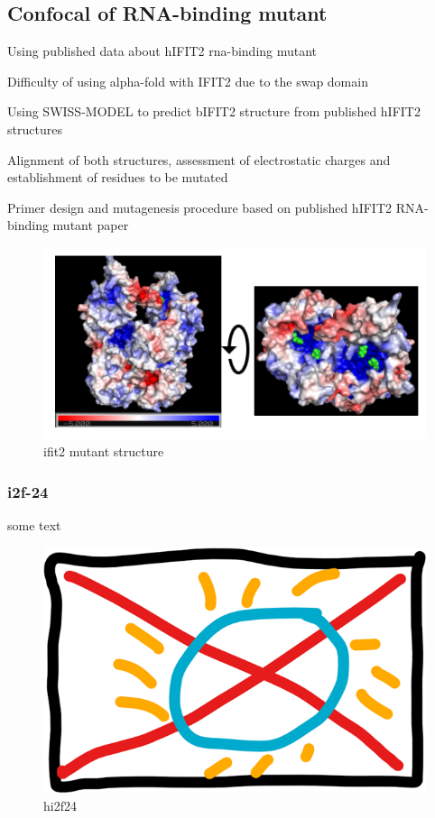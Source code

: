 \subsection{Confocal of RNA-binding mutant}
Using published data about hIFIT2 rna-binding mutant

Difficulty of using alpha-fold with IFIT2 due to the swap domain

Using SWISS-MODEL to predict bIFIT2 structure from published hIFIT2 structures

Alignment of both structures, assessment of electrostatic charges and establishment of residues to be mutated

Primer design and mutagenesis procedure based on published hIFIT2 RNA-binding mutant paper

\begin{figure}
    \centering
    \includegraphics[width=1\linewidth]{09. Chapter 4/Figs/05. IFIT2-RNA binding mutant/00. structure.png}
    \caption[ifit2 mutant structure]{ifit2 mutant structure}
    \label{ifit2 mutant structure}
\end{figure}

\subsubsection{i2f-24}
some text

\begin{figure}
    \centering
    \includegraphics[width=0.5\linewidth]{10. Chapter 5//Figs//04. IFIT2-mutant confocal/00. placeholder.png}
    \caption[hi2f24]{hi2f24}
    \label{hi2f24}
\end{figure}

